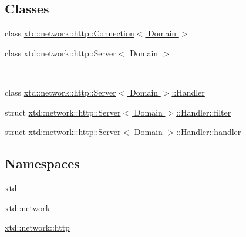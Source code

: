 \subsection*{Classes}
\begin{DoxyCompactItemize}
\item 
class \hyperlink{classxtd_1_1network_1_1http_1_1Connection}{xtd\+::network\+::http\+::\+Connection$<$ Domain $>$}
\item 
class \hyperlink{classxtd_1_1network_1_1http_1_1Server}{xtd\+::network\+::http\+::\+Server$<$ Domain $>$}
\begin{DoxyCompactList}\small\item\em ~\newline
~\newline
 \end{DoxyCompactList}\item 
class \hyperlink{classxtd_1_1network_1_1http_1_1Server_1_1Handler}{xtd\+::network\+::http\+::\+Server$<$ Domain $>$\+::\+Handler}
\item 
struct \hyperlink{structxtd_1_1network_1_1http_1_1Server_1_1Handler_1_1filter}{xtd\+::network\+::http\+::\+Server$<$ Domain $>$\+::\+Handler\+::filter}
\item 
struct \hyperlink{structxtd_1_1network_1_1http_1_1Server_1_1Handler_1_1handler}{xtd\+::network\+::http\+::\+Server$<$ Domain $>$\+::\+Handler\+::handler}
\end{DoxyCompactItemize}
\subsection*{Namespaces}
\begin{DoxyCompactItemize}
\item 
 \hyperlink{namespacextd}{xtd}
\item 
 \hyperlink{namespacextd_1_1network}{xtd\+::network}
\item 
 \hyperlink{namespacextd_1_1network_1_1http}{xtd\+::network\+::http}
\end{DoxyCompactItemize}
